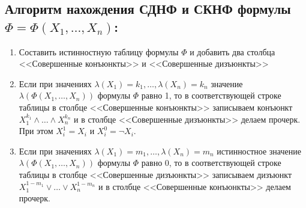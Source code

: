 \subsection*{Алгоритм нахождения СДНФ и СКНФ формулы \\$\Phi = \Phi(X_1,\ldots,X_n)$:}
\begin{enumerate}
    \item Составить истинностную таблицу формулы $\Phi$ и добавить два столбца <<Совершенные конъюнкты>> и <<Совершенные дизъюнкты>>
    
    \item Если при значениях $\lambda(X_1) = k_1,\ldots,\lambda(X_n) = k_n$ значение $\lambda(\Phi(X_1,\ldots,X_n))$ формулы $\Phi$ равно 1, то в соответствующей строке таблицы в столбце <<Совершенные конъюнкты>> записываем конъюнкт $X_1^{k_1}\land\ldots\land X_n^{k_n}$ и в столбце <<Совершенные дизъюнкты>> делаем прочерк. При этом $X_i^1 = X_i$ и $X_i^0 = \lnot X_i$.
    
    \item Если при значениях $\lambda(X_1) = m_1,\ldots,\lambda(X_n) = m_n$ истинностное значение $\lambda(\Phi(X_1,\ldots,X_n))$ формулы $\Phi$ равно 0, то в соответствующей строке таблицы в столбце <<Совершенные дизъюнкты>> записываем дизъюнкт $X_1^{1-m_1}\lor\ldots\lor X_n^{1-m_n}$ и в столбце <<Совершенные конъюнкты>> делаем прочерк.
\end{enumerate}
